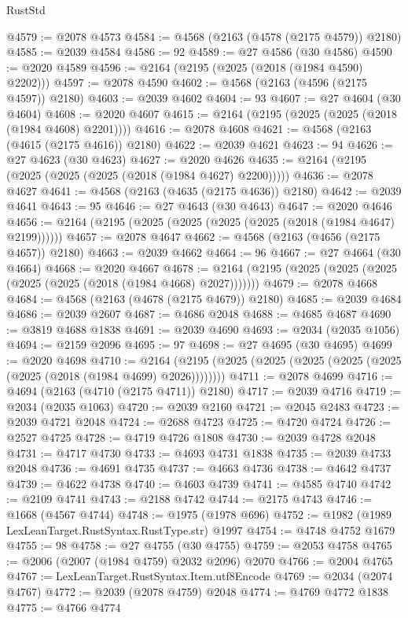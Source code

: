 \begin{lexlean}{RustStd}
\begin{coremodule}
@4579 := @2078 @4573
@4584 := @4568 (@2163 (@4578 (@2175 @4579)) @2180)
@4585 := @2039 @4584
@4586 := 92
@4589 := @27 @4586 (@30 @4586)
@4590 := @2020 @4589
@4596 := @2164 (@2195 (@2025 (@2018 (@1984 @4590) @2202)))
@4597 := @2078 @4590
@4602 := @4568 (@2163 (@4596 (@2175 @4597)) @2180)
@4603 := @2039 @4602
@4604 := 93
@4607 := @27 @4604 (@30 @4604)
@4608 := @2020 @4607
@4615 := @2164 (@2195 (@2025 (@2025 (@2018 (@1984 @4608) @2201))))
@4616 := @2078 @4608
@4621 := @4568 (@2163 (@4615 (@2175 @4616)) @2180)
@4622 := @2039 @4621
@4623 := 94
@4626 := @27 @4623 (@30 @4623)
@4627 := @2020 @4626
@4635 := @2164 (@2195 (@2025 (@2025 (@2025 (@2018 (@1984 @4627) @2200)))))
@4636 := @2078 @4627
@4641 := @4568 (@2163 (@4635 (@2175 @4636)) @2180)
@4642 := @2039 @4641
@4643 := 95
@4646 := @27 @4643 (@30 @4643)
@4647 := @2020 @4646
@4656 := @2164 (@2195 (@2025 (@2025 (@2025 (@2025 (@2018 (@1984 @4647) @2199))))))
@4657 := @2078 @4647
@4662 := @4568 (@2163 (@4656 (@2175 @4657)) @2180)
@4663 := @2039 @4662
@4664 := 96
@4667 := @27 @4664 (@30 @4664)
@4668 := @2020 @4667
@4678 := @2164 (@2195 (@2025 (@2025 (@2025 (@2025 (@2025 (@2018 (@1984 @4668) @2027)))))))
@4679 := @2078 @4668
@4684 := @4568 (@2163 (@4678 (@2175 @4679)) @2180)
@4685 := @2039 @4684
@4686 := @2039 @2607
@4687 := @4686 @2048
@4688 := @4685 @4687
@4690 := @3819 @4688 @1838
@4691 := @2039 @4690
@4693 := @2034 (@2035 @1056)
@4694 := @2159 @2096
@4695 := 97
@4698 := @27 @4695 (@30 @4695)
@4699 := @2020 @4698
@4710 := @2164 (@2195 (@2025 (@2025 (@2025 (@2025 (@2025 (@2025 (@2018 (@1984 @4699) @2026))))))))
@4711 := @2078 @4699
@4716 := @4694 (@2163 (@4710 (@2175 @4711)) @2180)
@4717 := @2039 @4716
@4719 := @2034 (@2035 @1063)
@4720 := @2039 @2160
@4721 := @2045 @2483
@4723 := @2039 @4721 @2048
@4724 := @2688 @4723
@4725 := @4720 @4724
@4726 := @2527 @4725
@4728 := @4719 @4726 @1808
@4730 := @2039 @4728 @2048
@4731 := @4717 @4730
@4733 := @4693 @4731 @1838
@4735 := @2039 @4733 @2048
@4736 := @4691 @4735
@4737 := @4663 @4736
@4738 := @4642 @4737
@4739 := @4622 @4738
@4740 := @4603 @4739
@4741 := @4585 @4740
@4742 := @2109 @4741
@4743 := @2188 @4742
@4744 := @2175 @4743
@4746 := @1668 (@4567 @4744)
@4748 := @1975 (@1978 @696)
@4752 := @1982 (@1989 LexLeanTarget.RustSyntax.RustType.str) @1997
@4754 := @4748 @4752 @1679
@4755 := 98
@4758 := @27 @4755 (@30 @4755)
@4759 := @2053 @4758
@4765 := @2006 (@2007 (@1984 @4759) @2032 @2096) @2070
@4766 := @2004 @4765
@4767 := LexLeanTarget.RustSyntax.Item.utf8Encode
@4769 := @2034 (@2074 @4767)
@4772 := @2039 (@2078 @4759) @2048
@4774 := @4769 @4772 @1838
@4775 := @4766 @4774

\end{coremodule}
\end{lexlean}
